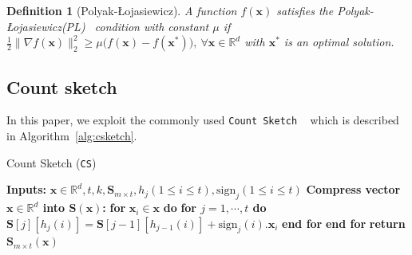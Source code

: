 \documentclass[11pt]{article}
\newcommand{\pl}{Polyak-\L{}ojasiewicz}
\newtheorem{definition}{Definition}
\begin{document}
\begin{definition}[\pl]\label{assum:pl}
A function $f(\boldsymbol{x})$ satisfies the \pl (PL)~ condition with constant $\mu$ if $\frac{1}{2}\|\nabla f(\boldsymbol{x})\|_2^2\geq \mu\big(f(\boldsymbol{x})-f(\boldsymbol{x}^*)\big),\: \forall \boldsymbol{x}\in\mathbb{R}^d $ with $\boldsymbol{x}^*$ is an optimal solution.
\end{definition}


\subsection{Count sketch}
 In this paper, we exploit the commonly used \texttt{Count Sketch} ~\citep{DBLP:journals/tcs/CharikarCF04} which is described in Algorithm~\ref{alg:csketch}.
 \begin{algorithm}[H]
\caption{Count Sketch ({\texttt{CS})~\citep{DBLP:journals/tcs/CharikarCF04}} }\label{alg:csketch}
 \begin{algorithmic}[1]
\STATE \textbf{Inputs:} $\boldsymbol{x}\in\mathbb{R}^{d}, t, k, \mathbf{S}_{m\times t}, h_j (1\leq i\leq t), \text{sign}_j (1\leq i\leq t)$
 \STATE \textbf{Compress vector $\boldsymbol{x}\in\mathbb{R}^{d}$ into $\mathbf{S}\left(\boldsymbol{x}\right)$:}
 \STATE \textbf{for} $\boldsymbol{x}_i\in\boldsymbol{x}$ \textbf{do}
 \STATE \quad\textbf{for $j=1,\cdots,t$ do}
 \STATE \quad\quad $\mathbf{S}[j][h_j(i)]=\mathbf{S}[j-1][h_{j-1}(i)]+\text{sign}_j(i).\boldsymbol{x}_i$ 
 \STATE \quad\textbf{end for}
 \STATE \textbf{end for}
 \STATE \textbf{return} $\mathbf{S}_{m\times t}(\boldsymbol{x})$
 \end{algorithmic}
 \end{algorithm}
\end{document}
